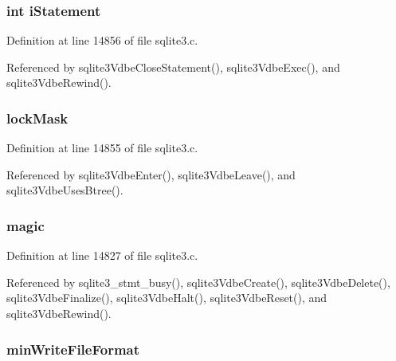 \hypertarget{struct_vdbe_ae8a83614afba1af0bcb49dc57f06fe97}{}
\subsubsection[{i\+Statement}]{\setlength{\rightskip}{0pt plus 5cm}int i\+Statement}\label{struct_vdbe_ae8a83614afba1af0bcb49dc57f06fe97}


Definition at line 14856 of file sqlite3.\+c.



Referenced by sqlite3\+Vdbe\+Close\+Statement(), sqlite3\+Vdbe\+Exec(), and sqlite3\+Vdbe\+Rewind().

\hypertarget{struct_vdbe_a724d4b924a935d68aa11aeee082ac8e3}{}
\subsubsection[{lock\+Mask}]{ lock\+Mask}\label{struct_vdbe_a724d4b924a935d68aa11aeee082ac8e3}


Definition at line 14855 of file sqlite3.\+c.



Referenced by sqlite3\+Vdbe\+Enter(), sqlite3\+Vdbe\+Leave(), and sqlite3\+Vdbe\+Uses\+Btree().

\hypertarget{struct_vdbe_a1c2f2992893a71ac0ee3f43477000176}{}
\subsubsection[{magic}]{ magic}\label{struct_vdbe_a1c2f2992893a71ac0ee3f43477000176}


Definition at line 14827 of file sqlite3.\+c.



Referenced by sqlite3\+\_\+stmt\+\_\+busy(), sqlite3\+Vdbe\+Create(), sqlite3\+Vdbe\+Delete(), sqlite3\+Vdbe\+Finalize(), sqlite3\+Vdbe\+Halt(), sqlite3\+Vdbe\+Reset(), and sqlite3\+Vdbe\+Rewind().

\hypertarget{struct_vdbe_ac5bee06812ea7532e4f9f7e56e19fd65}{}
\subsubsection[{min\+Write\+File\+Format}]{ min\+Write\+File\+Format}\label{struct_vdbe_ac5bee06812ea7532e4f9f7e56e19fd65}


